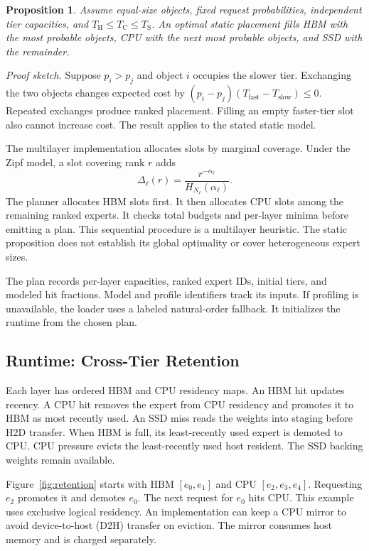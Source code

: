 \documentclass[conference,9pt,letterpaper]{IEEEtran}
\newtheorem{proposition}{Proposition}
\begin{document}
\begin{proposition}
Assume equal-size objects, fixed request probabilities, independent tier capacities, and $T_{\mathrm H}\le T_{\mathrm C}\le T_{\mathrm S}$. An optimal static placement fills HBM with the most probable objects, CPU with the next most probable objects, and SSD with the remainder.
\end{proposition}
\noindent\emph{Proof sketch.} Suppose $p_i>p_j$ and object $i$ occupies the slower tier. Exchanging the two objects changes expected cost by $(p_i-p_j)(T_{\mathrm{fast}}-T_{\mathrm{slow}})\le0$. Repeated exchanges produce ranked placement. Filling an empty faster-tier slot also cannot increase cost. The result applies to the stated static model.

The multilayer implementation allocates slots by marginal coverage. Under the Zipf model, a slot covering rank $r$ adds
\begin{equation}
 \Delta_{\ell}(r)=\frac{r^{-\alpha_\ell}}{H_{N_\ell}(\alpha_\ell)}.
\end{equation}
The planner allocates HBM slots first. It then allocates CPU slots among the remaining ranked experts. It checks total budgets and per-layer minima before emitting a plan. This sequential procedure is a multilayer heuristic. The static proposition does not establish its global optimality or cover heterogeneous expert sizes.

The plan records per-layer capacities, ranked expert IDs, initial tiers, and modeled hit fractions. Model and profile identifiers track its inputs. If profiling is unavailable, the loader uses a labeled natural-order fallback. It initializes the runtime from the chosen plan.

\subsection{Runtime: Cross-Tier Retention}
Each layer has ordered HBM and CPU residency maps. An HBM hit updates recency. A CPU hit removes the expert from CPU residency and promotes it to HBM as most recently used. An SSD miss reads the weights into staging before H2D transfer. When HBM is full, its least-recently used expert is demoted to CPU. CPU pressure evicts the least-recently used host resident. The SSD backing weights remain available.

Figure~\ref{fig:retention} starts with HBM $[e_0,e_1]$ and CPU $[e_2,e_3,e_4]$. Requesting $e_2$ promotes it and demotes $e_0$. The next request for $e_0$ hits CPU. This example uses exclusive logical residency. An implementation can keep a CPU mirror to avoid device-to-host (D2H) transfer on eviction. The mirror consumes host memory and is charged separately.
\end{document}
